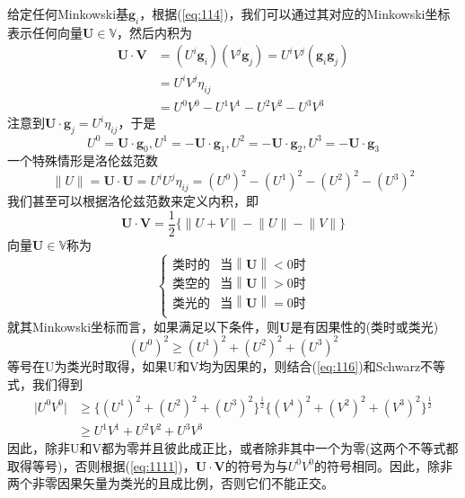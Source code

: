 \documentclass[utf8]{ctexbook}
\numberwithin{equation}{section}
\begin{document}
给定任何Minkowski基$\mathbf{g}_i$，根据(\ref{eq:114})，我们可以通过其对应的Minkowski坐标表示任何向量$\mathbf{U} \in \mathbb{V}$，然后内积为
\begin{align}
    \mathbf{U}\cdot \mathbf{V}&=(U^i\mathbf{g}_i)(V^j\mathbf{g}_j)=U^iV^j(\mathbf{g}_i\mathbf{g}_j)\\
    &=U^iV^j \eta_{ij}\\
    &=U^0V^0-U^1V^1-U^2V^2-U^3V^3 \label{eq:1111}
\end{align}
注意到$\mathbf{U}\cdot \mathbf{g}_j=U^i\eta_{ij}$，于是
\begin{equation}
    U^0 = \mathbf{U}\cdot \mathbf{g}_0,U^1 = -\mathbf{U}\cdot \mathbf{g}_1,U^2 = -\mathbf{U}\cdot \mathbf{g}_2,U^3 = -\mathbf{U}\cdot \mathbf{g}_3
\end{equation}
一个特殊情形是洛伦兹范数
\begin{equation}
    \lVert U\rVert =\mathbf{U}\cdot \mathbf{U} =U^iU^j\eta_{ij}=(U^0)^2-(U^1)^2-(U^2)^2-(U^3)^2\label{eq:1113}
\end{equation}
我们甚至可以根据洛伦兹范数来定义内积，即
\begin{equation}
    \mathbf{U}\cdot \mathbf{V}=\frac12 \{\lVert U+V\rVert-\lVert U\rVert-\lVert V\rVert \}\label{eq:1114}
\end{equation}
向量$\mathbf{U}\in \mathbb{V}$称为
\begin{equation}
    \begin{cases}
     \text{类时的}&\text{当}\left\lVert \mathbf{U}\right\rVert < 0\text{时} \\
     \text{类空的}&\text{当}\left\lVert \mathbf{U}\right\rVert > 0\text{时}\\
     \text{类光的}&\text{当}\left\lVert \mathbf{U}\right\rVert = 0\text{时}\\
    \end{cases} 
\end{equation}
就其Minkowski坐标而言，如果满足以下条件，则$\mathbf{U}$是有因果性的(类时或类光)
\begin{equation}
    (U^0)^2\geqslant (U^1)^2+(U^2)^2+(U^3)^2\label{eq:116}
\end{equation}
等号在U为类光时取得，如果U和V均为因果的，则结合(\ref{eq:116})和Schwarz不等式，我们得到
\begin{align}
    \lvert U^0V^0 \rvert&\geqslant\{(U^1)^2+(U^2)^2+(U^3)^2\}^{\frac{1}{2}}\{(V^1)^2+(V^2)^2+(V^3)^2\}^{\frac{1}{2}}\\
    &\geqslant U^1V^1+U^2V^2+U^3V^3
\end{align}
因此，除非U和V都为零并且彼此成正比，或者除非其中一个为零(这两个不等式都取得等号)，否则根据(\ref{eq:1111})，$\mathbf{U}\cdot \mathbf{V}$的符号为与$U^0V^0$的符号相同。因此，除非两个非零因果矢量为类光的且成比例，否则它们不能正交。
\end{document}

